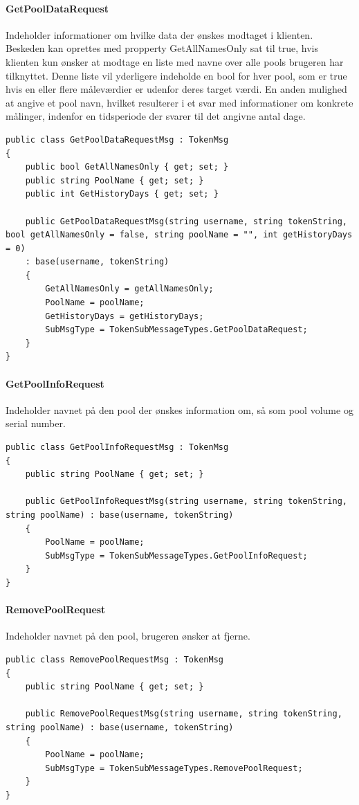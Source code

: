\paragraph{GetPoolDataRequest}
Indeholder informationer om hvilke data der ønskes modtaget i klienten. Beskeden kan oprettes med propperty GetAllNamesOnly sat til true, hvis klienten kun ønsker at modtage en liste med navne over alle pools brugeren har tilknyttet. Denne liste vil yderligere indeholde en bool for hver pool, som er true hvis en eller flere måleværdier er udenfor deres target værdi. En anden mulighed at angive et pool navn, hvilket resulterer i et svar med informationer om konkrete målinger, indenfor en tidsperiode der svarer til det angivne antal dage.
\begin{lstlisting}[caption=GetPoolDataRequest, label=code:GetPoolDataRequest]
public class GetPoolDataRequestMsg : TokenMsg
{
	public bool GetAllNamesOnly { get; set; }
	public string PoolName { get; set; }
	public int GetHistoryDays { get; set; }
	
	public GetPoolDataRequestMsg(string username, string tokenString, bool getAllNamesOnly = false, string poolName = "", int getHistoryDays = 0)
	: base(username, tokenString)
	{
		GetAllNamesOnly = getAllNamesOnly;
		PoolName = poolName;
		GetHistoryDays = getHistoryDays;
		SubMsgType = TokenSubMessageTypes.GetPoolDataRequest;
	}
}
\end{lstlisting}

\paragraph{GetPoolInfoRequest}
Indeholder navnet på den pool der ønskes information om, så som pool volume og serial number.
\begin{lstlisting}[caption=GetPoolInfoRequest, label=code:GetPoolInfoRequest]
public class GetPoolInfoRequestMsg : TokenMsg
{
	public string PoolName { get; set; }
	
	public GetPoolInfoRequestMsg(string username, string tokenString, string poolName) : base(username, tokenString)
	{
		PoolName = poolName;
		SubMsgType = TokenSubMessageTypes.GetPoolInfoRequest;
	}
}
\end{lstlisting}

\paragraph{RemovePoolRequest}
Indeholder navnet på den pool, brugeren ønsker at fjerne.
\begin{lstlisting}[caption=RemovePoolRequest, label=code:RemovePoolRequest]
public class RemovePoolRequestMsg : TokenMsg
{
	public string PoolName { get; set; }
	
	public RemovePoolRequestMsg(string username, string tokenString, string poolName) : base(username, tokenString)
	{
		PoolName = poolName;
		SubMsgType = TokenSubMessageTypes.RemovePoolRequest;
	}
}
\end{lstlisting}

